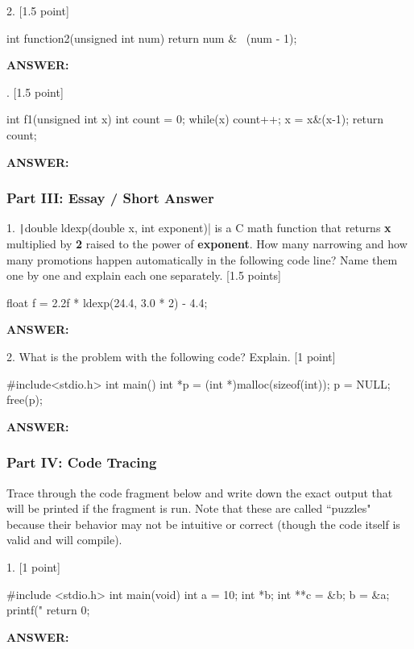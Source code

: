 \documentclass[12pt]{article}
\newenvironment{answerbox}{\par\begin{mdframed}[linewidth=1pt,linecolor=Black]%
		\begin{list}{}{\leftmargin=0.5cm}\item[\Large\bcplume]}
		{\end{list}\end{mdframed}\par}
\newenvironment{codeblock}{\VerbatimEnvironment\begin{c99*}{}}{\end{c99*}} %
\newcommand{\answer}[2]{
	
	\begin{answerbox}
		\textbf{ANSWER:} 
		
		\ifthenelse{\equal{#2}{}}{\vspace{#1}}{#2}
	\end{answerbox}
	
}
\begin{document}
2. [1.5 point]
\begin{codeblock}
int function2(unsigned int num) {
    return num & ~(num - 1);
}
\end{codeblock}
\answer{4.1cm}{%
}
. [1.5 point]
\begin{codeblock}
int f1(unsigned int x) {
  int count = 0;
  while(x) {
      count++; x = x&(x-1);
  }
  return count;
}
\end{codeblock}
\answer{4cm}{%
}

\subsubsection*{Part III: Essay / Short Answer}

1. \texttt|double ldexp(double x, int exponent)| is a C math function that returns \textbf{x} multiplied by \textbf{2} raised to the power of \textbf{exponent}. How many narrowing and how many promotions happen automatically in the following code line? Name them one by one and explain each one separately. [1.5 points]
\begin{codeblock}
float f = 2.2f * ldexp(24.4, 3.0 * 2) - 4.4;
\end{codeblock}
\answer{6.2cm}{%
}

2. What is the problem with the following code? Explain. [1 point]

\begin{codeblock}
#include<stdio.h>
int main() {
    int *p = (int *)malloc(sizeof(int));
    p = NULL;
    free(p);
}
\end{codeblock}
\answer{6cm}{%
}


\subsubsection*{Part IV: Code Tracing}

Trace through the code fragment below and write down the exact output that will be printed if the fragment is run. Note that these are called “puzzles" because their behavior may not be intuitive or correct (though the code itself is valid and will compile).


1. [1 point]
\begin{codeblock}
#include <stdio.h>
int main(void) {
  int a = 10; int *b; int **c = &b; b = &a;
  printf("%
  return 0;
}
\end{codeblock}
\answer{1.9cm}{%
}
\end{document}
